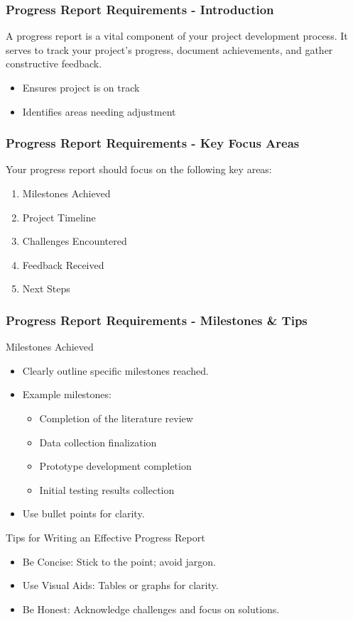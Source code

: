 \documentclass[aspectratio=169]{beamer}
\begin{document}
\begin{frame}[fragile]
    \frametitle{Progress Report Requirements - Introduction}
    A progress report is a vital component of your project development process. It serves to track your project’s progress, document achievements, and gather constructive feedback. 
    \begin{itemize}
        \item Ensures project is on track
        \item Identifies areas needing adjustment
    \end{itemize}
\end{frame}

\begin{frame}[fragile]
    \frametitle{Progress Report Requirements - Key Focus Areas}
    Your progress report should focus on the following key areas:
    \begin{enumerate}
        \item Milestones Achieved
        \item Project Timeline
        \item Challenges Encountered
        \item Feedback Received
        \item Next Steps
    \end{enumerate}
\end{frame}

\begin{frame}[fragile]
    \frametitle{Progress Report Requirements - Milestones & Tips}
    \begin{block}{Milestones Achieved}
        \begin{itemize}
            \item Clearly outline specific milestones reached.
            \item Example milestones:
            \begin{itemize}
                \item Completion of the literature review
                \item Data collection finalization
                \item Prototype development completion
                \item Initial testing results collection
            \end{itemize}
            \item Use bullet points for clarity.
        \end{itemize}
    \end{block}
    
    \begin{block}{Tips for Writing an Effective Progress Report}
        \begin{itemize}
            \item Be Concise: Stick to the point; avoid jargon.
            \item Use Visual Aids: Tables or graphs for clarity.
            \item Be Honest: Acknowledge challenges and focus on solutions.
        \end{itemize}
    \end{block}
\end{frame}
\end{document}

